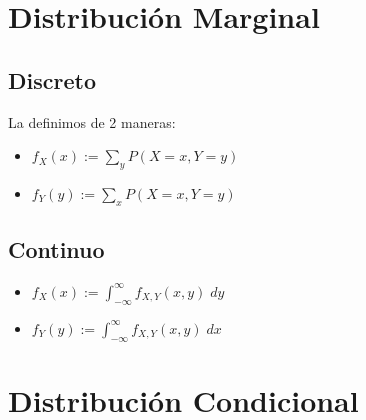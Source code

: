 \documentclass[12pt, fleqn]{report}                             %
\theoremstyle{break}                                            %
\newcommand{\inftyInt} {\int_{-\infty}^{\infty}}                %
\begin{document}
        \section{Distribución Marginal}

            \vspace{1em}
            \subsection{Discreto}

                La definimos de 2 maneras:
                \begin{itemize}
                    \item
                        $\displaystyle f_X(x) := \sum_y P(X = x, Y = y)$ 
                    \item
                        $\displaystyle f_Y(y) := \sum_x P(X = x, Y = y)$ 
                \end{itemize}


            \vspace{1em}
            \subsection{Continuo}

                \begin{itemize}
                    \item
                        $\displaystyle f_X(x) := \inftyInt f_{X, Y}(x, y) \; dy$ 
                    \item
                        $\displaystyle f_Y(y) := \inftyInt f_{X, Y}(x, y) \; dx$ 
                \end{itemize}


        \clearpage
        \section{Distribución Condicional}
\end{document}
